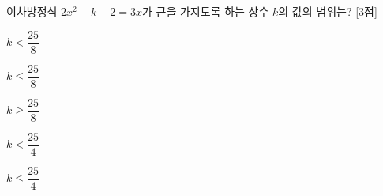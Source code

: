 이차방정식 $2x^2+k-2=3x$가 근을 가지도록 하는 상수 $k$의 값의 범위는? \mbox{[3점]}
\begin{choices32}{\rule[-3ex]{0pt}{8ex}$k<\dfrac{25}{8}$}{\rule[-3ex]{0pt}{8ex}$k\le\dfrac{25}{8}$}{\rule[-3ex]{0pt}{8ex}$k\ge\dfrac{25}{8}$}{\rule[-3ex]{0pt}{8ex}$k<\dfrac{25}{4}$}{\rule[-3ex]{0pt}{8ex}$k\le\dfrac{25}{4}$}\end{choices32}
